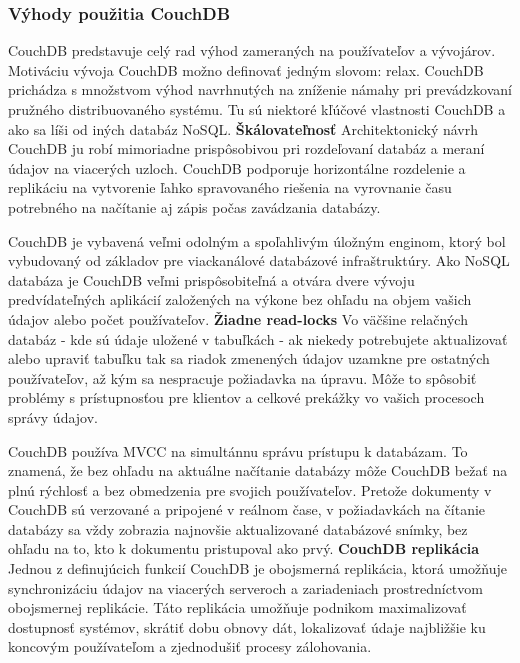 \subsubsection{Výhody použitia CouchDB}
\indent CouchDB predstavuje celý rad výhod zameraných na používateľov a vývojárov. Motiváciu vývoja CouchDB možno definovať jedným slovom: relax. CouchDB prichádza s množstvom výhod navrhnutých na zníženie námahy pri prevádzkovaní pružného distribuovaného systému. Tu sú niektoré kľúčové vlastnosti CouchDB a ako sa líši od iných databáz NoSQL.
\newline
\newline
\textbf{Škálovateľnosť} \newline
\indent Architektonický návrh CouchDB ju robí mimoriadne prispôsobivou pri rozdeľovaní databáz a meraní údajov na viacerých uzloch. CouchDB podporuje horizontálne rozdelenie a replikáciu na vytvorenie ľahko spravovaného riešenia na vyrovnanie času potrebného na načítanie aj zápis počas zavádzania databázy.

\indent CouchDB je vybavená veľmi odolným a spoľahlivým úložným enginom, ktorý bol vybudovaný od základov pre viackanálové databázové infraštruktúry. Ako NoSQL databáza je CouchDB veľmi prispôsobiteľná a otvára dvere vývoju predvídateľných aplikácií založených na výkone bez ohľadu na objem vašich údajov alebo počet používateľov.
\newline
\newline
\textbf{Žiadne read-locks} \newline
\indent Vo väčšine relačných databáz - kde sú údaje uložené v tabuľkách - ak niekedy potrebujete aktualizovať alebo upraviť tabuľku tak sa riadok zmenených údajov uzamkne pre ostatných používateľov, až kým sa nespracuje požiadavka na úpravu. Môže to spôsobiť problémy s prístupnosťou pre klientov a celkové prekážky vo vašich procesoch správy údajov.

\indent CouchDB používa MVCC na simultánnu správu prístupu k databázam. To znamená, že bez ohľadu na aktuálne načítanie databázy môže CouchDB bežať na plnú rýchlosť a bez obmedzenia pre svojich používateľov. Pretože dokumenty v CouchDB sú verzované a pripojené v reálnom čase, v požiadavkách na čítanie databázy sa vždy zobrazia najnovšie aktualizované databázové snímky, bez ohľadu na to, kto k dokumentu pristupoval ako prvý.
\newline
\newline
\textbf{CouchDB replikácia} \newline
\indent Jednou z definujúcich funkcií CouchDB je obojsmerná replikácia, ktorá umožňuje synchronizáciu údajov na viacerých serveroch a zariadeniach prostredníctvom obojsmernej replikácie. Táto replikácia umožňuje podnikom maximalizovať dostupnosť systémov, skrátiť dobu obnovy dát, lokalizovať údaje najbližšie ku koncovým používateľom a zjednodušiť procesy zálohovania.

